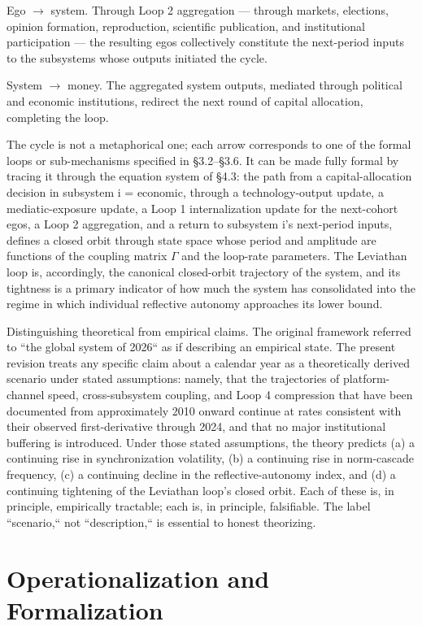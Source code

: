 \documentclass[12pt,a4paper]{article}
\begin{document}
Ego $\rightarrow$ system. Through Loop 2 aggregation --- through markets, elections, opinion formation, reproduction, scientific publication, and institutional participation --- the resulting egos collectively constitute the next-period inputs to the subsystems whose outputs initiated the cycle.

System $\rightarrow$ money. The aggregated system outputs, mediated through political and economic institutions, redirect the next round of capital allocation, completing the loop.


The cycle is not a metaphorical one; each arrow corresponds to one of the formal loops or sub-mechanisms specified in §3.2--§3.6. It can be made fully formal by tracing it through the equation system of §4.3: the path from a capital-allocation decision in subsystem i = economic, through a technology-output update, a mediatic-exposure update, a Loop 1 internalization update for the next-cohort egos, a Loop 2 aggregation, and a return to subsystem i's next-period inputs, defines a closed orbit through state space whose period and amplitude are functions of the coupling matrix $\Gamma$ and the loop-rate parameters. The Leviathan loop is, accordingly, the canonical closed-orbit trajectory of the system, and its tightness is a primary indicator of how much the system has consolidated into the regime in which individual reflective autonomy approaches its lower bound.


Distinguishing theoretical from empirical claims. The original framework referred to ``the global system of 2026`` as if describing an empirical state. The present revision treats any specific claim about a calendar year as a theoretically derived scenario under stated assumptions: namely, that the trajectories of platform-channel speed, cross-subsystem coupling, and Loop 4 compression that have been documented from approximately 2010 onward continue at rates consistent with their observed first-derivative through 2024, and that no major institutional buffering is introduced. Under those stated assumptions, the theory predicts (a) a continuing rise in synchronization volatility, (b) a continuing rise in norm-cascade frequency, (c) a continuing decline in the reflective-autonomy index, and (d) a continuing tightening of the Leviathan loop's closed orbit. Each of these is, in principle, empirically tractable; each is, in principle, falsifiable. The label ``scenario,`` not ``description,`` is essential to honest theorizing.



\section{Operationalization and Formalization}
\end{document}
